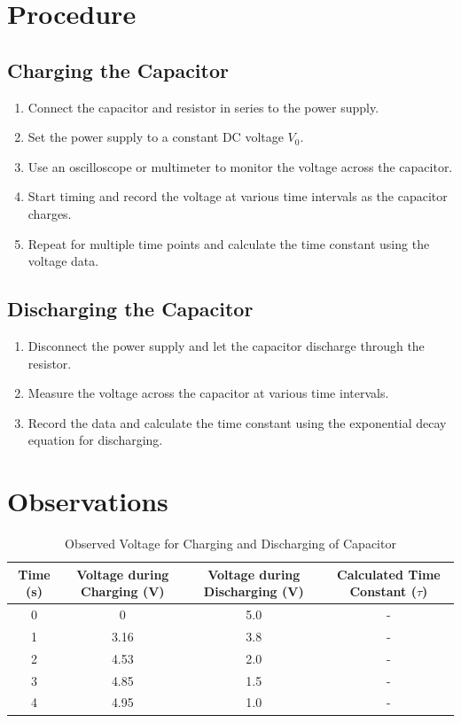 \documentclass[a4paper,12pt]{article}
\begin{document}
\section*{\color{myblue}Procedure}

\subsection*{\color{myred}Charging the Capacitor}
\begin{enumerate}
    \item Connect the capacitor and resistor in series to the power supply.
    \item Set the power supply to a constant DC voltage $V_0$.
    \item Use an oscilloscope or multimeter to monitor the voltage across the capacitor.
    \item Start timing and record the voltage at various time intervals as the capacitor charges.
    \item Repeat for multiple time points and calculate the time constant using the voltage data.
\end{enumerate}

\subsection*{\color{myred}Discharging the Capacitor}
\begin{enumerate}
    \item Disconnect the power supply and let the capacitor discharge through the resistor.
    \item Measure the voltage across the capacitor at various time intervals.
    \item Record the data and calculate the time constant using the exponential decay equation for discharging.
\end{enumerate}

\section*{\color{myblue}Observations}

\begin{table}[H]
\centering
{}\arrayrulewidth=1pt
\begin{tabular}{|c|c|c|c|}
\hline
\rowcolor{mygray} \textbf{Time (s)} & \textbf{Voltage during Charging (V)} & \textbf{Voltage during Discharging (V)} & \textbf{Calculated Time Constant ($\tau$)} \\\hline
0 & 0 & 5.0 & - \\\hline
1 & 3.16 & 3.8 & - \\\hline
2 & 4.53 & 2.0 & - \\\hline
3 & 4.85 & 1.5 & - \\\hline
4 & 4.95 & 1.0 & - \\\hline
\end{tabular}
\caption{\color{myblue}Observed Voltage for Charging and Discharging of Capacitor}
\end{table}
\end{document}
